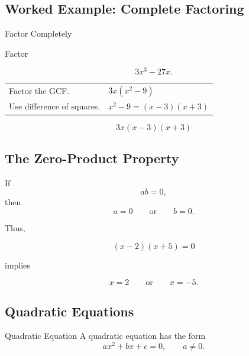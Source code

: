 \subsection{Worked Example: Complete Factoring}
\label{subsec:worked-complete-factoring}

\begin{workedexamplebox}{Factor Completely}

Factor

\[ 3x^3-27x. \]

\begin{tabularx}{\textwidth}{@{}>{\raggedright\arraybackslash}p{}X@{}}
Factor the GCF. & \(3x(x^2-9)\)\\
Use difference of squares. & \(x^2-9=(x-3)(x+3)\)
\end{tabularx}

\begin{answerbox}
\[ 3x(x-3)(x+3) \]
\end{answerbox}
\end{workedexamplebox}

\subsection{The Zero-Product Property}
\label{subsec:zero-product-property}

\begin{theorem}
If
\[ ab=0, \]
then
\[ a=0\qquad\text{or}\qquad b=0. \]
\end{theorem}

Thus,

\[ (x-2)(x+5)=0 \]

implies

\[ x=2\qquad\text{or}\qquad x=-5. \]

\subsection{Quadratic Equations}
\label{subsec:quadratic-equations}

\begin{definitionbox}{Quadratic Equation}
A quadratic equation has the form
\[ ax^2+bx+c=0,\qquad a\neq0. \]
\end{definitionbox}

